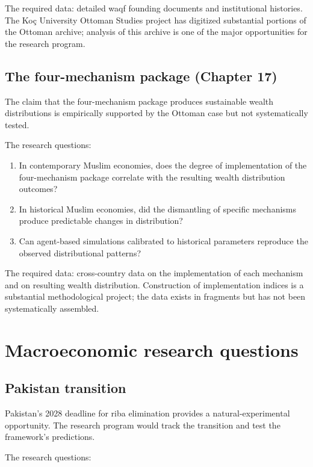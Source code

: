 The required data: detailed waqf founding documents and
institutional histories. The Ko\c{c} University Ottoman Studies
project has digitized substantial portions of the Ottoman archive;
analysis of this archive is one of the major opportunities for the
research program.

\subsection{The four-mechanism package (Chapter 17)}

The claim that the four-mechanism package produces sustainable
wealth distributions is empirically supported by the Ottoman case
but not systematically tested.

The research questions:

\begin{enumerate}[leftmargin=2em]
    \item In contemporary Muslim economies, does the degree of
    implementation of the four-mechanism package correlate with
    the resulting wealth distribution outcomes?
    \item In historical Muslim economies, did the dismantling of
    specific mechanisms produce predictable changes in
    distribution?
    \item Can agent-based simulations calibrated to historical
    parameters reproduce the observed distributional patterns?
\end{enumerate}

The required data: cross-country data on the implementation of
each mechanism and on resulting wealth distribution. Construction
of implementation indices is a substantial methodological
project; the data exists in fragments but has not been
systematically assembled.

\section{Macroeconomic research questions}
\label{sec:agenda-macro}

\subsection{Pakistan transition}

Pakistan's 2028 deadline for riba elimination provides a
natural-experimental opportunity. The research program would
track the transition and test the framework's predictions.

The research questions:

